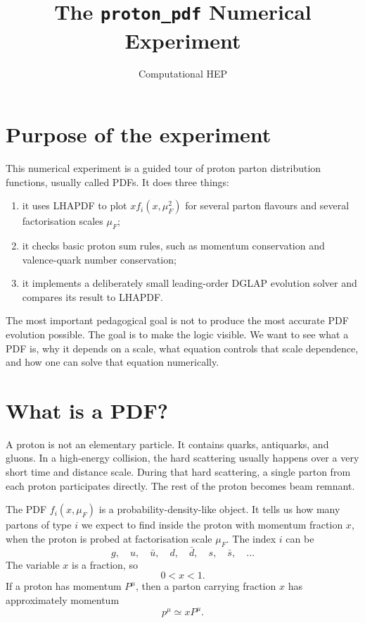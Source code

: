 \documentclass[11pt]{article}
\title{The \texttt{proton\_pdf} Numerical Experiment}
\author{Computational HEP}
\date{}
\newcommand{\muf}{\mu_F}
\begin{document}
\maketitle

\section{Purpose of the experiment}

This numerical experiment is a guided tour of proton parton distribution
functions, usually called PDFs.  It does three things:
\begin{enumerate}
  \item it uses LHAPDF to plot \(x f_i(x,\muf^2)\) for several parton flavours
        and several factorisation scales \(\muf\);
  \item it checks basic proton sum rules, such as momentum conservation and
        valence-quark number conservation;
  \item it implements a deliberately small leading-order DGLAP evolution solver
        and compares its result to LHAPDF.
\end{enumerate}
The most important pedagogical goal is not to produce the most accurate PDF
evolution possible.  The goal is to make the logic visible.  We want to see
what a PDF is, why it depends on a scale, what equation controls that scale
dependence, and how one can solve that equation numerically.

\section{What is a PDF?}

A proton is not an elementary particle.  It contains quarks, antiquarks, and
gluons.  In a high-energy collision, the hard scattering usually happens over
a very short time and distance scale.  During that hard scattering, a single
parton from each proton participates directly.  The rest of the proton becomes
beam remnant.

The PDF \(f_i(x,\muf)\) is a probability-density-like object.  It tells us how
many partons of type \(i\) we expect to find inside the proton with momentum
fraction \(x\), when the proton is probed at factorisation scale \(\muf\).
The index \(i\) can be
\[
  g,\quad u,\quad \bar u,\quad d,\quad \bar d,\quad s,\quad \bar s,\quad \ldots
\]
The variable \(x\) is a fraction, so
\[
  0 < x < 1.
\]
If a proton has momentum \(P^\mu\), then a parton carrying fraction \(x\) has
approximately momentum
\[
  p^\mu \simeq x P^\mu .
\]
\end{document}
